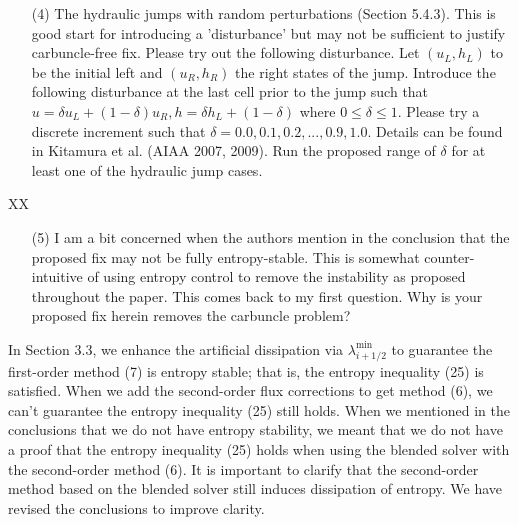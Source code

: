 \documentclass[english,11pt]{article}
\begin{document}
\bigskip
{\color{red}
  \begin{itemize}
  \item[(4)]
    The hydraulic jumps with random perturbations (Section 5.4.3). This is good start for introducing a
    'disturbance' but may not be sufficient to justify carbuncle-free fix. Please try out the following
    disturbance. Let $(u_L, h_L)$ to be the initial left and $(u_R, h_R)$ the right states of the jump. 
    Introduce the following disturbance at the last cell prior to the jump such that 
    $u=\delta { u_L} + (1-\delta)u_R, h=\delta {h_L} + (1-\delta)$ where $0\leq{\delta}\leq{1}$. 
    Please try a discrete increment such that $\delta = 0.0, 0.1, 0.2,...,0.9, 1.0$. 
    Details can be found in Kitamura et al. (AIAA 2007, 2009). Run the proposed range of $\delta$
    for at least one of the hydraulic jump cases.
  \end{itemize}
}
\noindent
XX

\bigskip
{\color{red}
  \begin{itemize}
  \item[(5)]
    I am a bit concerned when the authors mention in the conclusion that the proposed fix may not be fully
    entropy-stable. This is somewhat counter-intuitive of using entropy control to remove the instability as
    proposed throughout the paper. This comes back to my first question. Why is your proposed fix herein
    removes the carbuncle problem?
  \end{itemize}
}
\noindent
In Section 3.3, we enhance the artificial dissipation via $\lambda_{i+1/2}^{\min}$ to guarantee the first-order method (7)
is entropy stable; that is, the entropy inequality (25) is satisfied. When we add the second-order flux corrections to get method (6),
we can't guarantee the entropy inequality (25) still holds. When we mentioned in the conclusions that we do not have
entropy stability, we meant that we do not have a proof that the entropy inequality (25) holds when using the blended solver
with the second-order method (6). It is important to clarify that the second-order method based on the blended solver
still induces dissipation of entropy. We have revised the conclusions to improve clarity. 
\end{document}

